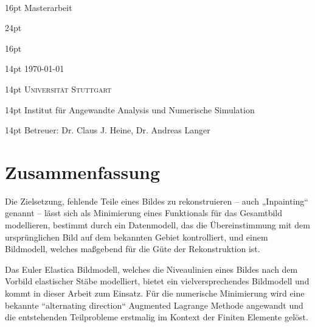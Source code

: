 
\begin{titlepage}
  \begin{center}
    ~\par\vspace{4em}
    {
      \fontsize { 16pt } { 16pt } \selectfont
      Masterarbeit
    }
    \par\vspace{3em}
    {
      \fontsize { 24pt } { 24pt } \selectfont \sffamily \bfseries
      \thetitle
    }
    \par\vspace{3em}
    {
      \fontsize { 16pt } { 16pt } \selectfont \scshape
      \theauthor
    }
    \par\vspace{1.5em}
    {
      \fontsize { 14pt } { 14pt } \selectfont %
      \today
    }
    \par\vspace{4.5em}
    {
    }
    \par\vspace{8em}
    {
      \fontsize { 14pt } { 14pt } \selectfont \scshape
      Universität Stuttgart
    }
    \par\vspace{1em}
    {
      \fontsize { 14pt } { 14pt } \selectfont %
      Institut für Angewandte Analysis und Numerische Simulation
    }
    \par\vspace{1em}
    {
      \fontsize { 14pt } { 14pt } \selectfont %
      Betreuer:
      Dr. Claus J. Heine,
      Dr. Andreas Langer
    }
  \end{center}
\end{titlepage}

\chapter*{Zusammenfassung}

Die Zielsetzung, fehlende Teile eines Bildes zu rekonstruieren – auch „Inpainting“ genannt – lässt sich als Minimierung eines
Funktionals für das Gesamtbild modellieren, bestimmt durch ein Datenmodell, das die Übereinstimmung mit dem ursprünglichen Bild auf dem bekannten Gebiet kontrolliert, und einem Bildmodell, welches maßgebend für die Güte der Rekonstruktion ist.

Das Euler Elastica Bildmodell, welches die Niveaulinien eines Bildes nach dem Vorbild elastischer Stäbe modelliert, bietet ein vielversprechendes Bildmodell und kommt in dieser Arbeit zum Einsatz.
Für die numerische Minimierung wird eine bekannte “alternating direction“ Augmented Lagrange Methode angewandt und die entstehenden Teilprobleme erstmalig im Kontext der Finiten Elemente gelöst.


{
  \let\clearpage\relax
  \tableofcontents
}

